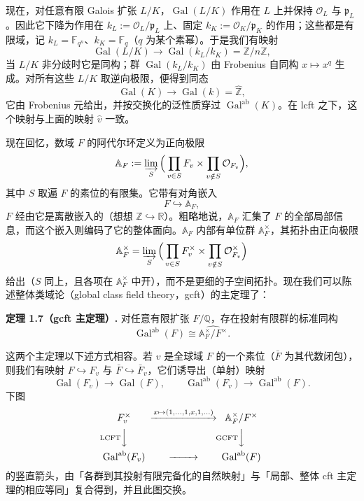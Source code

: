现在，对任意有限 Galois 扩张 $L/K$，$\operatorname{Gal}(L/K)$ 作用在 $L$ 上并保持 $\mathcal{O}_L$ 与 $\mathfrak{p}_L$。因此它下降为作用在 $k_L:=\mathcal{O}_L/\mathfrak{p}_L$ 上、固定 $k_K:=\mathcal{O}_K/\mathfrak{p}_K$ 的作用；这些都是有限域，记 $k_L=\mathbb{F}_{q^n}$、$k_K=\mathbb{F}_q$（$q$ 为某个素幂）。于是我们有映射
\[
  \operatorname{Gal}(L/K)\to\operatorname{Gal}(k_L/k_K)=\mathbb{Z}/n\mathbb{Z},
\]
当 $L/K$ 非分歧时它是同构；群 $\operatorname{Gal}(k_L/k_K)$ 由 Frobenius 自同构 $x\mapsto x^q$ 生成。对所有这些 $L/K$ 取逆向极限，便得到同态
\[
  \operatorname{Gal}(K)\to\operatorname{Gal}(k)=\widehat{\mathbb{Z}},
\]
它由 Frobenius 元给出，并按交换化的泛性质穿过 $\operatorname{Gal}^{\mathrm{ab}}(K)$。在 lcft 之下，这个映射与上面的映射 $\hat v$ 一致。

现在回忆，数域 $F$ 的阿代尔环定义为正向极限
\[
  \mathbb{A}_F:=\varinjlim_{S}\Big(\prod_{v\in S}F_v\times\prod_{v\notin S}\mathcal{O}_{F_v}\Big),
\]
其中 $S$ 取遍 $F$ 的素位的有限集。它带有对角嵌入
\[
  F\hookrightarrow\mathbb{A}_F,
\]
$F$ 经由它是离散嵌入的（想想 $\mathbb{Z}\hookrightarrow\mathbb{R}$）。粗略地说，$\mathbb{A}_F$ 汇集了 $F$ 的全部局部信息，而这个嵌入则编码了它的整体面向。$\mathbb{A}_F$ 内部有单位群 $\mathbb{A}_F^{\times}$，其拓扑由正向极限
\[
  \mathbb{A}_F^{\times}=\varinjlim_{S}\Big(\prod_{v\in S}F_v^{\times}\times\prod_{v\notin S}\mathcal{O}_{F_v}^{\times}\Big)
\]
给出（$S$ 同上，且各项在 $\mathbb{A}_F^{\times}$ 中开），而不是更细的子空间拓扑。现在我们可以陈述整体类域论（global class field theory，gcft）的主定理了：

\textbf{定理 1.7（gcft 主定理）.} 对任意有限扩张 $F/\mathbb{Q}$，存在投射有限群的标准同构
\[
  \operatorname{Gal}^{\mathrm{ab}}(F)\cong\widehat{\mathbb{A}_F^{\times}/F^{\times}}.
\]

这两个主定理以下述方式相容。若 $v$ 是全球域 $F$ 的一个素位（$\bar F$ 为其代数闭包），则我们有映射 $F\hookrightarrow F_v$ 与 $\bar F\hookrightarrow\bar F_v$，它们诱导出（单射）映射
\[
  \operatorname{Gal}(F_v)\to\operatorname{Gal}(F),\qquad
  \operatorname{Gal}^{\mathrm{ab}}(F_v)\to\operatorname{Gal}^{\mathrm{ab}}(F).
\]
下图
\[
  \begin{CD}
    F_v^{\times} @>{x\mapsto(1,\ldots,1,x,1,\ldots)}>> \mathbb{A}_F^{\times}/F^{\times}\\
    @V{\mathrm{LCFT}}VV @V{\mathrm{GCFT}}VV\\
    \operatorname{Gal}^{\mathrm{ab}}(F_v) @>>> \operatorname{Gal}^{\mathrm{ab}}(F)
  \end{CD}
\]
的竖直箭头，由「各群到其投射有限完备化的自然映射」与「局部、整体 cft 主定理的相应等同」复合得到，并且此图交换。

